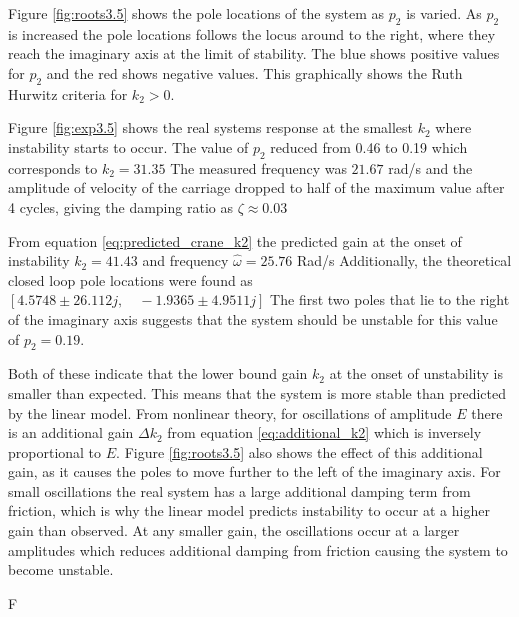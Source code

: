 \documentclass{article}
\begin{document}
Figure \ref{fig:roots3.5} shows the pole locations of the system as $p_2$ is varied. As $p_2$ is increased the pole locations follows the locus around to the right, where they reach the imaginary axis at the limit of stability.
The blue shows positive values for $p_2$ and the red shows negative values. This graphically shows the Ruth Hurwitz criteria for $k_2 > 0$.

Figure \ref{fig:exp3.5} shows the real systems response at the smallest $k_2$ where instability starts to occur.
The value of $p_2$ reduced from 0.46 to 0.19 which corresponds to $k_2 = 31.35$
The measured frequency was $21.67$ rad/s and the amplitude of velocity of the carriage dropped to half of the maximum value after 4 cycles, giving the damping ratio as $\zeta \approx 0.03$

From equation \ref{eq:predicted_crane_k2} the predicted gain at the onset of instability $k_2 = 41.43$ and frequency $\hat{\omega} = 25.76$ Rad/s
Additionally, the theoretical closed loop pole locations were found as \\ 
$[ 4.5748 \pm 26.112j , \quad -1.9365 \pm 4.9511j]$
The first two poles that lie to the right of the imaginary axis suggests that the system should be unstable for this value of $p_2 = 0.19$.

Both of these indicate that the lower bound gain $k_2$ at the onset of unstability is smaller than expected. This means that the system is more stable than predicted by the linear model.
From nonlinear theory, for oscillations of amplitude $E$ there is an additional gain $\Delta k_2$ from equation \ref{eq:additional_k2} which is inversely proportional to $E$.
Figure \ref{fig:roots3.5} also shows the effect of this additional gain, as it causes the poles to move further to the left of the imaginary axis.
For small oscillations the real system has a large additional damping term from friction, which is why the linear model predicts instability to occur at a higher gain than observed.
At any smaller gain, the oscillations occur at a larger amplitudes which reduces additional damping from friction causing the system to become unstable.

F%
\end{document}
